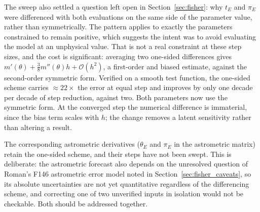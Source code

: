 The sweep also settled a question left open in Section~\ref{sec:fisher}: why $t_E$ and $\pi_E$ were
differenced with both evaluations on the same side of the parameter value, rather than
symmetrically. The pattern applies to exactly the parameters constrained to remain positive, which
suggests the intent was to avoid evaluating the model at an unphysical value. That is not a real
constraint at these step sizes, and the cost is significant: averaging two one-sided differences
gives $m'(\theta) + \tfrac{3}{8}m''(\theta)h + \mathcal{O}(h^2)$, a first-order and biased estimate,
against the second-order symmetric form. Verified on a smooth test function, the one-sided scheme
carries $\approx\!22\times$ the error at equal step and improves by only one decade per decade of
step reduction, against two. Both parameters now use the symmetric form. At the converged step the
numerical difference is immaterial, since the bias term scales with $h$; the change removes a
latent sensitivity rather than altering a result.

The corresponding astrometric derivatives ($\theta_E$ and $\pi_E$ in the astrometric matrix) retain
the one-sided scheme, and their steps have not been swept. This is deliberate: the astrometric
forecast also depends on the unresolved question of Roman's F146 astrometric error model noted in
Section~\ref{sec:fisher_caveats}, so its absolute uncertainties are not yet quantitative regardless
of the differencing scheme, and correcting one of two unverified inputs in isolation would not be
checkable. Both should be addressed together.

